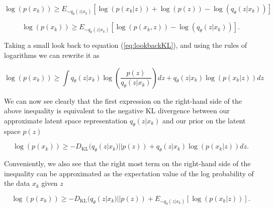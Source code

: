 \begin{equation}
    \log(p(x_k)) \geq E_{\sim q_{\theta}(z|x_k)} 
    [\log(p(x_k|z)) + \log(p(z)) - \log(q_{\theta}(z|x_k))]
\end{equation}

\begin{equation}
    \log(p(x_k)) \geq E_{\sim q_{\theta}(z|x_k)} 
    [\log(p(x_k,z)) - \log(q_{\theta}(z|x_k))].
\end{equation}

Taking a small look back to equation (\ref{eq:lookbackKL}), 
and using the rules of logarithms we can rewrite it as 

\begin{equation}
    \log(p(x_k)) \geq \int q_{\theta}(z|x_k)
    \log(\frac{p(z)}{q_{\theta}(z|x_k)})dz + 
    q_{\theta}(z|x_k) \log({p(x_k|z)}) dz
\end{equation}

We can now see clearly that the first expression on the 
right-hand side of the above inequality is equivalent to the 
negative \ac{KL} divergence between our approximate latent space 
representation $q_{\theta}(z|x_k)$ and our prior on 
the latent space $p(z)$

\begin{equation}
    \log(p(x_k)) \geq - D_{\textrm{KL}}(q_{\theta}(z|x_k) || p(z)) + 
    q_{\theta}(z|x_k) \log({p(x_k|z)}) dz. 
\end{equation}

Conveniently, we also see that the right most term on the 
right-hand side of the inequality can be approximated as the 
expectation value of the log probability of the data $x_k$ 
given $z$

\begin{equation}
    \log(p(x_k)) \geq - D_{\textrm{KL}}(q_{\theta}(z|x_k) || p(z)) + 
    E_{\sim q_{\theta}(z|x_k)}[ \log({p(x_k|z)})].\label{eq:vae_loss}
\end{equation}

